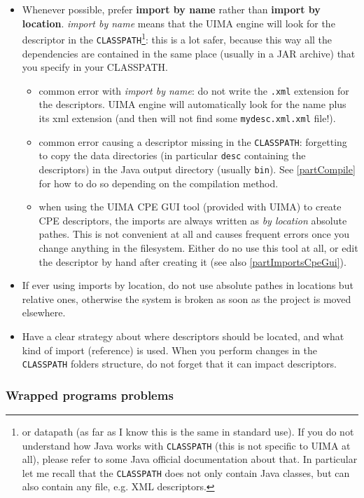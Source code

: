 \documentclass{article}
\newenvironment{xitemize}{
\begin{itemize}
  \setlength{\itemsep}{.3\baselineskip}
  \setlength{\topsep}{0pt}
  \setlength{\parskip}{0pt}
  \setlength{\parsep}{0pt}
}{\end{itemize}}
\begin{document}
\begin{xitemize}
\item Whenever possible, prefer {\bf import by name} rather than {\bf import by location}.  {\em import by name} means that the UIMA engine will look for the descriptor in the {\tt CLASSPATH}\footnote{or datapath (as far as I know this is the same in standard use). If you do not understand how Java works with {\tt CLASSPATH} (this is not specific to UIMA at all), please refer to some Java official documentation about that. In particular let me recall that the {\tt CLASSPATH} does not only contain Java classes, but can also contain any file, e.g. XML descriptors.}: this is a lot safer, because this way all the dependencies are contained in the same place (usually in a JAR archive) that you specify in your CLASSPATH.
\begin{xitemize}
\item common error with {\em import by name}: do not write the {\tt .xml} extension for the descriptors. UIMA engine will automatically look for the name plus its xml extension (and then will not find some {\tt mydesc.xml.xml} file!).
\item common error causing a descriptor missing in the {\tt CLASSPATH}: forgetting to copy the data directories (in particular {\tt desc} containing the descriptors) in the Java  output directory (usually {\tt bin}). See \ref{partCompile} for how to do so depending on the compilation method.
\item when using the UIMA CPE GUI tool (provided with UIMA) to create CPE descriptors, the imports are always written as {\em by location} absolute pathes. This is not convenient at all and causes frequent errors once you change anything in the filesystem. Either do no use this tool at all, or edit the descriptor by hand after creating it (see also \ref{partImportsCpeGui}).
\end{xitemize}
\item If ever using imports by location, do not use absolute pathes in locations but relative ones, otherwise the system is broken as soon as the project is moved elsewhere.
\item Have a clear strategy about where descriptors should be located, and what kind of import (reference) is used. When you perform changes in the {\tt CLASSPATH} folders structure, do not forget that it can impact descriptors.
\end{xitemize}


\subsubsection{Wrapped programs problems}
\end{document}
